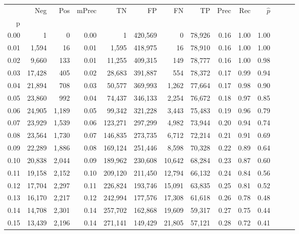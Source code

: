 \begin{tabular}{rrrrrrrrrrrrrr}
\toprule
{} &     Neg &    Pos & mPrec &       TN &       FP &      FN &      TP &  Prec &   Rec & $\hat{p}$ \\
p    &         &        &       &          &          &         &         &       &       &           \\
\midrule
0.00 &       1 &      0 &  0.00 &        1 &  420,569 &       0 &  78,926 &  0.16 &  1.00 &      1.00 \\
0.01 &   1,594 &     16 &  0.01 &    1,595 &  418,975 &      16 &  78,910 &  0.16 &  1.00 &      1.00 \\
0.02 &   9,660 &    133 &  0.01 &   11,255 &  409,315 &     149 &  78,777 &  0.16 &  1.00 &      0.98 \\
0.03 &  17,428 &    405 &  0.02 &   28,683 &  391,887 &     554 &  78,372 &  0.17 &  0.99 &      0.94 \\
0.04 &  21,894 &    708 &  0.03 &   50,577 &  369,993 &   1,262 &  77,664 &  0.17 &  0.98 &      0.90 \\
0.05 &  23,860 &    992 &  0.04 &   74,437 &  346,133 &   2,254 &  76,672 &  0.18 &  0.97 &      0.85 \\
0.06 &  24,905 &  1,189 &  0.05 &   99,342 &  321,228 &   3,443 &  75,483 &  0.19 &  0.96 &      0.79 \\
0.07 &  23,929 &  1,539 &  0.06 &  123,271 &  297,299 &   4,982 &  73,944 &  0.20 &  0.94 &      0.74 \\
0.08 &  23,564 &  1,730 &  0.07 &  146,835 &  273,735 &   6,712 &  72,214 &  0.21 &  0.91 &      0.69 \\
0.09 &  22,289 &  1,886 &  0.08 &  169,124 &  251,446 &   8,598 &  70,328 &  0.22 &  0.89 &      0.64 \\
0.10 &  20,838 &  2,044 &  0.09 &  189,962 &  230,608 &  10,642 &  68,284 &  0.23 &  0.87 &      0.60 \\
0.11 &  19,158 &  2,152 &  0.10 &  209,120 &  211,450 &  12,794 &  66,132 &  0.24 &  0.84 &      0.56 \\
0.12 &  17,704 &  2,297 &  0.11 &  226,824 &  193,746 &  15,091 &  63,835 &  0.25 &  0.81 &      0.52 \\
0.13 &  16,170 &  2,217 &  0.12 &  242,994 &  177,576 &  17,308 &  61,618 &  0.26 &  0.78 &      0.48 \\
0.14 &  14,708 &  2,301 &  0.14 &  257,702 &  162,868 &  19,609 &  59,317 &  0.27 &  0.75 &      0.44 \\
0.15 &  13,439 &  2,196 &  0.14 &  271,141 &  149,429 &  21,805 &  57,121 &  0.28 &  0.72 &      0.41 \\

\end{tabular}
